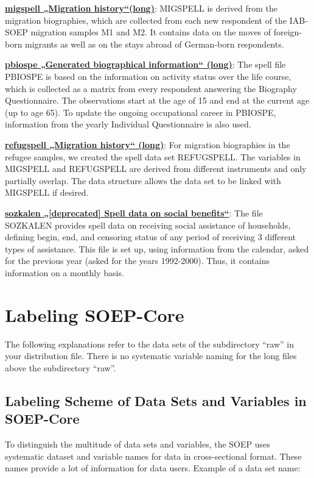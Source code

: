 \documentclass[letterpaper,10pt,openany,onesideH,english]{sphinxmanual}
\begin{document}
 \href{https://paneldata.org/soep-core/data/migspell}{\textbf{migspell „Migration history“(long)}}: MIGSPELL is derived from the migration biographies, which are collected from each new respondent of the IAB-SOEP migration samples M1 and M2. It contains data on the moves of foreign-born migrants as well as on the stays abroad of German-born respondents.

 \href{https://paneldata.org/soep-core/data/pbiospe}{\textbf{pbiospe „Generated biographical information“ (long)}}: The spell file PBIOSPE is based on the information on activity status over the life course, which is collected as a matrix from every respondent answering the Biography Questionnaire. The observations start at the age of 15 and end at the current age (up to age 65). To update the ongoing occupational career in PBIOSPE, information from the yearly Individual Questionnaire is also used.

 \href{https://paneldata.org/soep-core/data/refugspell}{\textbf{refugspell „Migration history“ (long)}}: For migration biographies in the refugee samples, we created the spell data set REFUGSPELL. The variables in MIGSPELL and REFUGSPELL are derived from different instruments and only partially overlap. The data structure allows the data set to be linked with MIGSPELL if desired.

 \href{https://paneldata.org/soep-core/data/sozkalen}{\textbf{sozkalen „[deprecated] Spell data on social benefits“}}: The file SOZKALEN provides spell data on receiving social assistance of households, defining begin, end, and censoring status of any period of receiving 3 different types of assistance. This file is set up, using information from the calendar, asked for the previous year (asked for the years 1992-2000). Thus, it contains information on a monthly basis.


\section{Labeling SOEP-Core}
\label{\detokenize{Principles of Data Structure/index:labeling-soep-core}}\label{\detokenize{Principles of Data Structure/index:label}}
The following explanations refer to the data sets of the subdirectory “raw” in your distribution file. There is no systematic variable naming for the long files above the subdirectory “raw”.


\subsection{Labeling Scheme of Data Sets and Variables in SOEP-Core}
\label{\detokenize{Principles of Data Structure/index:labeling-scheme-of-data-sets-and-variables-in-soep-core}}
To distinguish the multitude of data sets and variables, the SOEP uses systematic dataset and variable names for data in cross-sectional format. These names provide a lot of information for data users.
Example of a data set name:
\end{document}
